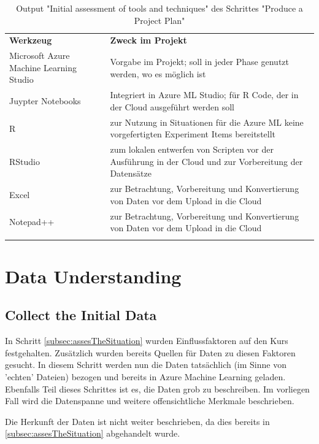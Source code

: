 \begin{longtable}[!h]{|p{4cm}|p{11cm}|}
\hline
\textbf{Werkzeug} & \textbf{Zweck im Projekt}\\ 
\hhline{==}
Microsoft Azure Machine Learning Studio & Vorgabe im Projekt; soll in jeder Phase genutzt werden, wo es möglich ist \\ \hline
Juypter Notebooks & Integriert in Azure ML Studio; für R Code, der in der Cloud ausgeführt werden soll \\ \hline
R & zur Nutzung in Situationen für die Azure ML keine vorgefertigten Experiment Items bereitstellt \\ \hline
RStudio & zum lokalen entwerfen von Scripten vor der Ausführung in der Cloud und zur Vorbereitung der Datensätze \\ \hline
Excel & zur Betrachtung, Vorbereitung und Konvertierung von Daten vor dem Upload in die Cloud \\ \hline
Notepad++ & zur Betrachtung, Vorbereitung und Konvertierung von Daten vor dem Upload in die Cloud \\ \hline
\caption{Output "Initial assessment of tools and techniques" des Schrittes "Produce a Project Plan"}
\label{tab:projectPlan}
\end{longtable}


\section{Data Understanding}
\subsection{Collect the Initial Data} \label{subsec:collection}
In Schritt \ref{subsec:assesTheSituation} wurden Einflussfaktoren auf den Kurs festgehalten. Zusätzlich wurden bereits Quellen für Daten zu diesen Faktoren gesucht. In diesem Schritt werden nun die Daten tatsächlich (im Sinne von 'echten' Dateien) bezogen und bereits in Azure Machine Learning geladen. Ebenfalls Teil dieses Schrittes ist es, die Daten grob zu beschreiben. Im vorliegen Fall wird die Datenspanne und weitere offensichtliche Merkmale beschrieben. \newline

Die Herkunft der Daten ist nicht weiter beschrieben, da dies bereits in \ref{subsec:assesTheSituation} abgehandelt wurde. \newline

